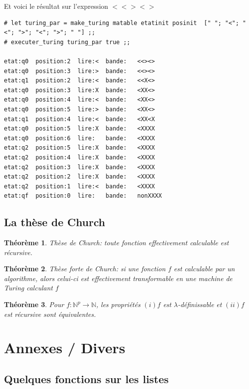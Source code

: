 \documentclass[11pt]{book}
\newtheorem{theoreme}{Théorème}
\begin{document}
Et voici le résultat sur l'expression $ <<><> $
\begin{Verbatim}
# let turing_par = make_turing matable etatinit posinit  [" "; "<"; "<"; ">"; "<"; ">"; " "] ;;
# executer_turing turing_par true ;;

etat:q0  position:2  lire:<  bande:   <<><> 
etat:q0  position:3  lire:>  bande:   <<><> 
etat:q1  position:2  lire:<  bande:   <<X<> 
etat:q0  position:3  lire:X  bande:   <XX<> 
etat:q0  position:4  lire:<  bande:   <XX<> 
etat:q0  position:5  lire:>  bande:   <XX<> 
etat:q1  position:4  lire:<  bande:   <XX<X 
etat:q0  position:5  lire:X  bande:   <XXXX 
etat:q0  position:6  lire:   bande:   <XXXX  
etat:q2  position:5  lire:X  bande:   <XXXX  
etat:q2  position:4  lire:X  bande:   <XXXX  
etat:q2  position:3  lire:X  bande:   <XXXX  
etat:q2  position:2  lire:X  bande:   <XXXX  
etat:q2  position:1  lire:<  bande:   <XXXX  
etat:qf  position:0  lire:   bande:   nonXXXX  
\end{Verbatim}
\section{La thèse de Church}
\begin{theoreme}
	Thèse de Church: toute fonction effectivement calculable est récursive.
\end{theoreme}
\begin{theoreme}
	Thèse forte de Church: si une fonction $f$ est calculable par un algorithme, 
	alors celui-ci est effectivement transformable en une machine de Turing 
	calculant $f$
\end{theoreme}
\begin{theoreme}
  Pour $f:\mathbb{N}^p \rightarrow \mathbb{N}$, les propriétés $(i) f$ est $\lambda$-définissable et 
  $(ii) f$ est récursive sont équivalentes.
\end{theoreme}


\chapter{Annexes / Divers}
\section{Quelques fonctions sur les listes}
 
\end{document}
